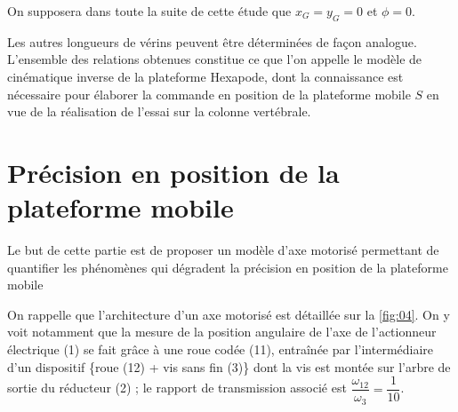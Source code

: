 On supposera dans toute la suite de cette étude que $x_G = y_G = 0$ et $\phi=0$.


Les autres longueurs de vérins peuvent être déterminées de façon analogue. L’ensemble des relations obtenues
constitue ce que l’on appelle le modèle de cinématique inverse de la plateforme Hexapode, dont la connaissance
est nécessaire pour élaborer la commande en position de la plateforme mobile $S$ en vue de la réalisation de
l’essai sur la colonne vertébrale.
\ifprof
\begin{corrige}
\end{corrige}
\else
\fi


\ifprof
\begin{corrige}
\end{corrige}
\else
\fi

\section{\label{sec:02}Précision en position de la plateforme mobile}
\begin{obj}
Le but de cette partie est de proposer un modèle d’axe motorisé permettant de quantifier les phénomènes qui dégradent la précision en position de la plateforme mobile
\end{obj}

On rappelle que l’architecture d’un axe motorisé est détaillée sur la \autoref{fig:04}. On y voit notamment que la mesure
de la position angulaire de l’axe de l’actionneur électrique (1) se fait grâce à une roue codée (11), entraînée
par l’intermédiaire d’un dispositif \{roue (12) + vis sans fin (3)\} dont la vis est montée sur l’arbre de sortie du
réducteur (2) ; le rapport de transmission associé est $\dfrac{\omega_{12}}{\omega_{3}}= \dfrac{1}{10}$.


